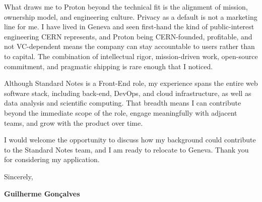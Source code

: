 \documentclass[11pt,a4paper]{article}
\begin{document}
What draws me to Proton beyond the technical fit is the alignment of mission, ownership model, and engineering culture. Privacy as a default is not a marketing line for me. I have lived in Geneva and seen first-hand the kind of public-interest engineering CERN represents, and Proton being CERN-founded, profitable, and not VC-dependent means the company can stay accountable to users rather than to capital. The combination of intellectual rigor, mission-driven work, open-source commitment, and pragmatic shipping is rare enough that I noticed.

Although Standard Notes is a Front-End role, my experience spans the entire web software stack, including back-end, DevOps, and cloud infrastructure, as well as data analysis and scientific computing. That breadth means I can contribute beyond the immediate scope of the role, engage meaningfully with adjacent teams, and grow with the product over time.

I would welcome the opportunity to discuss how my background could contribute to the Standard Notes team, and I am ready to relocate to Geneva. Thank you for considering my application.

\vspace{1em}

\closing{Sincerely,}

\vspace{2em}

\textbf{Guilherme Gonçalves}
\end{document}
